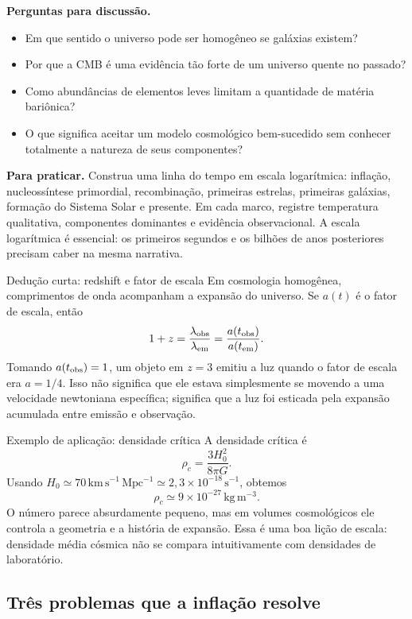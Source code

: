 \documentclass[11pt,a4paper]{article}
\begin{document}
\textbf{Perguntas para discussão.}
\begin{itemize}
\item Em que sentido o universo pode ser homogêneo se galáxias existem?
\item Por que a CMB é uma evidência tão forte de um universo quente no passado?
\item Como abundâncias de elementos leves limitam a quantidade de matéria bariônica?
\item O que significa aceitar um modelo cosmológico bem-sucedido sem conhecer totalmente a natureza de seus componentes?
\end{itemize}

\textbf{Para praticar.} Construa uma linha do tempo em escala logarítmica: inflação, nucleossíntese primordial, recombinação, primeiras estrelas, primeiras galáxias, formação do Sistema Solar e presente. Em cada marco, registre temperatura qualitativa, componentes dominantes e evidência observacional. A escala logarítmica é essencial: os primeiros segundos e os bilhões de anos posteriores precisam caber na mesma narrativa.

\begin{lessonblock}[borderline west={2pt}{0pt}{astroGold}]{Dedução curta: redshift e fator de escala}
Em cosmologia homogênea, comprimentos de onda acompanham a expansão do universo. Se $a(t)$ é o fator de escala, então
\[
1+z=\frac{\lambda_{\rm obs}}{\lambda_{\rm em}}=\frac{a(t_{\rm obs})}{a(t_{\rm em})}.
\]
Tomando $a(t_{\rm obs})=1$, um objeto em $z=3$ emitiu a luz quando o fator de escala era $a=1/4$. Isso não significa que ele estava simplesmente se movendo a uma velocidade newtoniana específica; significa que a luz foi esticada pela expansão acumulada entre emissão e observação.
\end{lessonblock}

\begin{lessonblock}{Exemplo de aplicação: densidade crítica}
A densidade crítica é
\[
\rho_c=\frac{3H_0^2}{8\pi G}.
\]
Usando $H_0\simeq70\,\mathrm{km\,s^{-1}\,Mpc^{-1}}\simeq2{,}3\times10^{-18}\,\mathrm{s^{-1}}$, obtemos
\[
\rho_c\simeq9\times10^{-27}\,\mathrm{kg\,m^{-3}}.
\]
O número parece absurdamente pequeno, mas em volumes cosmológicos ele controla a geometria e a história de expansão. Essa é uma boa lição de escala: densidade média cósmica não se compara intuitivamente com densidades de laboratório.
\end{lessonblock}

\subsection*{Três problemas que a inflação resolve}
\end{document}
